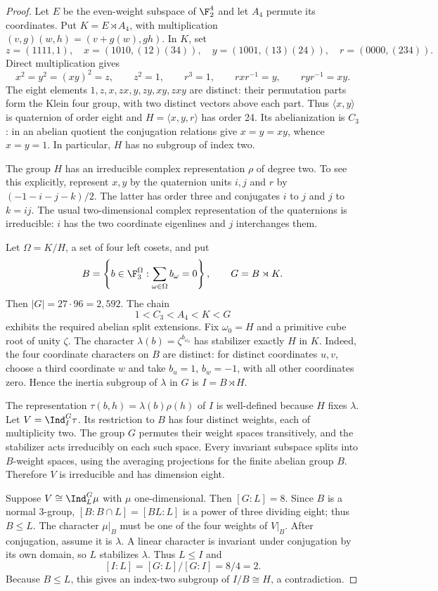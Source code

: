 \begin{proof}
Let $E$ be the even-weight subspace of $\F_2^4$ and let $A_4$
permute its coordinates. Put $K=E\rtimes A_4$, with multiplication
$(v,g)(w,h)=(v+g(w),gh)$. In $K$, set
\[
z=(1111,1),\quad
x=(1010,(12)(34)),\quad
y=(1001,(13)(24)),\quad
r=(0000,(234)).
\]
Direct multiplication gives
\[
x^2=y^2=(xy)^2=z,\qquad
z^2=1,\qquad r^3=1,\qquad
rxr^{-1}=y,\qquad ryr^{-1}=xy.
\]
The eight elements $1,z,x,zx,y,zy,xy,zxy$ are distinct:
their permutation parts form the Klein four group, with two
distinct vectors above each part. Thus $\langle x,y\rangle$
is quaternion of order eight and
$H=\langle x,y,r\rangle$ has order 24.
Its abelianization is $C_3$: in an abelian quotient the
conjugation relations give $x=y=xy$, whence $x=y=1$.
In particular, $H$ has no subgroup of index two.

The group $H$ has an irreducible complex representation $\rho$
of degree two. To see this explicitly, represent $x,y$ by the
quaternion units $i,j$ and $r$ by
$(-1-i-j-k)/2$. The latter has order three and conjugates
$i$ to $j$ and $j$ to $k=ij$.
The usual two-dimensional complex representation of the
quaternions is irreducible: $i$ has the two coordinate
eigenlines and $j$ interchanges them.

Let $\Omega=K/H$, a set of four left cosets, and put
\[
B=\left\{b\in\F_3^\Omega:\sum_{\omega\in\Omega}b_\omega=0\right\},
\qquad G=B\rtimes K.
\]
Then $|G|=27\cdot96=2,592$. The chain
\[
1<C_3<A_4<K<G
\]
exhibits the required abelian split extensions.
Fix $\omega_0=H$ and a primitive cube root of unity $\zeta$.
The character $\lambda(b)=\zeta^{b_{\omega_0}}$ has stabilizer
exactly $H$ in $K$. Indeed, the four coordinate characters on
$B$ are distinct: for distinct coordinates $u,v$, choose a
third coordinate $w$ and take $b_u=1$, $b_w=-1$, with all
other coordinates zero. Hence the inertia subgroup of
$\lambda$ in $G$ is $I=B\rtimes H$.

The representation
$\tau(b,h)=\lambda(b)\rho(h)$ of $I$ is well-defined because
$H$ fixes $\lambda$. Let $V=\Ind_I^G\tau$. Its restriction
to $B$ has four distinct weights, each of multiplicity two.
The group $G$ permutes their weight spaces transitively,
and the stabilizer acts irreducibly on each such space.
Every invariant subspace splits into $B$-weight spaces,
using the averaging projections for the finite abelian
group $B$. Therefore $V$ is irreducible and has dimension
eight.

Suppose $V\cong\Ind_L^G\mu$ with $\mu$ one-dimensional.
Then $[G:L]=8$. Since $B$ is a normal 3-group,
$[B:B\cap L]=[BL:L]$ is a power of three dividing eight;
thus $B\le L$. The character $\mu|_B$ must be one of the
four weights of $V|_B$. After conjugation, assume it is
$\lambda$. A linear character is invariant under
conjugation by its own domain, so $L$ stabilizes $\lambda$.
Thus $L\le I$ and
\[
[I:L]=[G:L]/[G:I]=8/4=2.
\]
Because $B\le L$, this gives an index-two subgroup of
$I/B\cong H$, a contradiction.
\end{proof}

